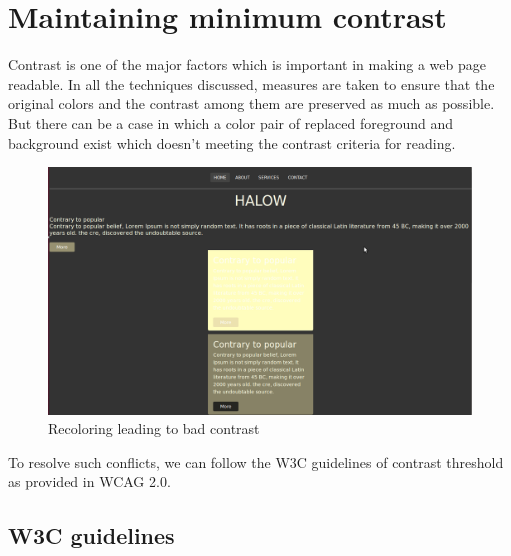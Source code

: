 \section{Maintaining minimum contrast} %
\label{Maintaining minimum contrast}
Contrast is one of the major factors which is important in making a web page readable. In all the techniques discussed, measures are taken to ensure that the original colors and the contrast among them are preserved as much as possible. But there can be a case in which a color pair of replaced foreground and background exist which doesn't meeting the contrast criteria for reading.


\begin{figure}[!htb]
\centering
\includegraphics[width=.5\linewidth]{recolor.png}
\caption{Recoloring leading to bad contrast}
\label{fig:sub1}
\end{figure} 

To resolve such conflicts, we can follow the W3C guidelines of contrast threshold as provided in WCAG 2.0. 

\subsection{W3C guidelines} %
\label{W3C guidelines}

